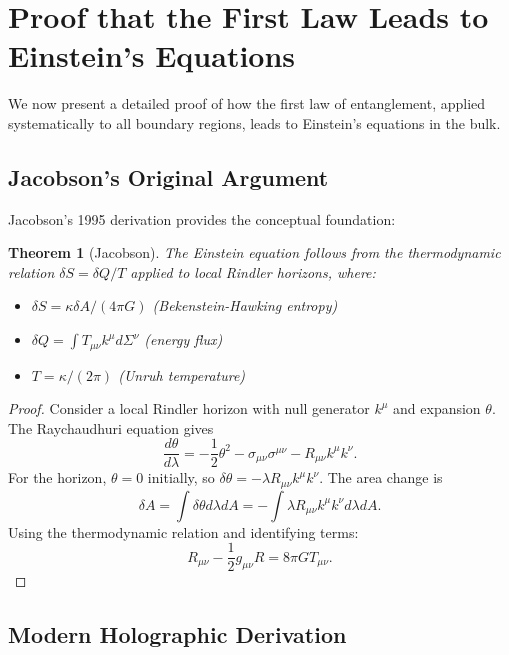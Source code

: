 \documentclass[11pt,letterpaper]{article}
\newtheorem{theorem}{Theorem}[section]
\begin{document}
\section{Proof that the First Law Leads to Einstein's Equations}

We now present a detailed proof of how the first law of entanglement, applied systematically to all boundary regions, leads to Einstein's equations in the bulk.

\subsection{Jacobson's Original Argument}

Jacobson's 1995 derivation provides the conceptual foundation:

\begin{theorem}[Jacobson]
The Einstein equation follows from the thermodynamic relation $\delta S = \delta Q/T$ applied to local Rindler horizons, where:
\begin{itemize}
\item $\delta S = \kappa \delta A/(4\pi G)$ (Bekenstein-Hawking entropy)
\item $\delta Q = \int T_{\mu\nu}k^\mu d\Sigma^\nu$ (energy flux)
\item $T = \kappa/(2\pi)$ (Unruh temperature)
\end{itemize}
\end{theorem}

\begin{proof}
Consider a local Rindler horizon with null generator $k^\mu$ and expansion $\theta$. The Raychaudhuri equation gives
\begin{equation}
\frac{d\theta}{d\lambda} = -\frac{1}{2}\theta^2 - \sigma_{\mu\nu}\sigma^{\mu\nu} - R_{\mu\nu}k^\mu k^\nu.
\end{equation}
For the horizon, $\theta = 0$ initially, so $\delta\theta = -\lambda R_{\mu\nu}k^\mu k^\nu$. The area change is
\begin{equation}
\delta A = \int \delta\theta d\lambda dA = -\int \lambda R_{\mu\nu}k^\mu k^\nu d\lambda dA.
\end{equation}
Using the thermodynamic relation and identifying terms:
\begin{equation}
R_{\mu\nu} - \frac{1}{2}g_{\mu\nu}R = 8\pi G T_{\mu\nu}.
\end{equation}
\end{proof}

\subsection{Modern Holographic Derivation}
\end{document}
